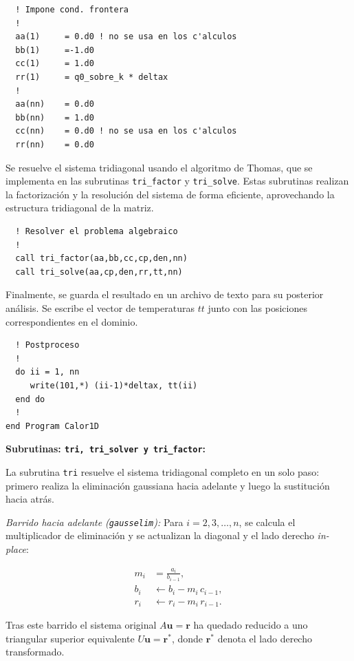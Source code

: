 \documentclass[11pt,a4paper]{article}
\begin{document}
\begin{verbatim}
  ! Impone cond. frontera
  !
  aa(1)     = 0.d0 ! no se usa en los c'alculos
  bb(1)     =-1.d0
  cc(1)     = 1.d0
  rr(1)     = q0_sobre_k * deltax
  !  
  aa(nn)    = 0.d0
  bb(nn)    = 1.d0
  cc(nn)    = 0.d0 ! no se usa en los c'alculos
  rr(nn)    = 0.d0
\end{verbatim}

Se resuelve el sistema tridiagonal usando el algoritmo de Thomas, que se 
implementa en las subrutinas \verb|tri_factor| y \verb|tri_solve|. Estas
subrutinas realizan la factorizaci\'on y la resoluci\'on del sistema de 
forma eficiente, aprovechando la estructura tridiagonal de la matriz.

\begin{verbatim}
  ! Resolver el problema algebraico
  !
  call tri_factor(aa,bb,cc,cp,den,nn)
  call tri_solve(aa,cp,den,rr,tt,nn)
\end{verbatim}

Finalmente, se guarda el resultado en un archivo de texto para su posterior
an\'alisis. Se escribe el vector de temperaturas $tt$ junto con las posiciones
correspondientes en el dominio.

\begin{verbatim}
  ! Postproceso
  !
  do ii = 1, nn
     write(101,*) (ii-1)*deltax, tt(ii)
  end do
  !
end Program Calor1D
\end{verbatim}

\textbf{Subrutinas: \texttt{tri, tri\_solver y tri\_factor}:}  

La subrutina \verb|tri| resuelve el sistema tridiagonal completo en un solo
paso: primero realiza la eliminaci\'on gaussiana hacia adelante y luego la
sustituci\'on hacia atr\'as.

\medskip

\textit{Barrido hacia adelante (\texttt{gausselim}):}
Para $i = 2, 3, \ldots, n$, se calcula el multiplicador de eliminaci\'on y
se actualizan la diagonal y el lado derecho \textit{in-place}:

\begin{align}
m_i          &= \frac{a_i}{b_{i-1}}, \\
b_i          &\leftarrow b_i - m_i\, c_{i-1}, \\
r_i          &\leftarrow r_i - m_i\, r_{i-1}.
\end{align}

Tras este barrido el sistema original $A\mathbf{u}=\mathbf{r}$ ha quedado
reducido a uno triangular superior equivalente $U\mathbf{u}=\mathbf{r}^*$,
donde $\mathbf{r}^*$ denota el lado derecho transformado.
\end{document}
